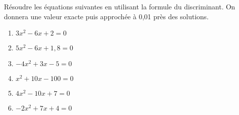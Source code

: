\begin{exo}
Résoudre les équations suivantes en utilisant la formule du discriminant. On donnera une valeur exacte puis approchée  à 0,01 près des solutions.

\vspace{-2mm}
\begin{multicols}{2}
\begin{enumerate}[label=\bf{\alph*})\,]

\item $3x^2-6x+2=0$

\item $5x^2-6x+1,8=0$

\item $-4x^2+3x-5=0$

\item $x^2+10x-100=0$

\item $4x^2-10x+7=0$

\item $-2x^2+7x+4=0$
\end{enumerate}
\end{multicols}
\end{exo}




